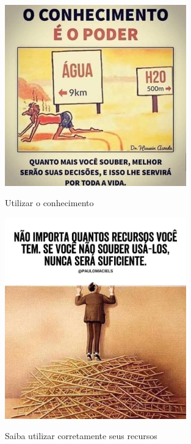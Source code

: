 \begin{figure}
    \centering
    \caption{Utilizar o conhecimento}
	\includegraphics[width=0.7\textwidth]{erros/conhecimento_h2o.jpg}
    \label{fig:conhecimento_h2o}
\end{figure}

\begin{figure}
    \centering
    \caption{Saiba utilizar corretamente seus recursos}
	\includegraphics[width=0.7\textwidth]{erros/uso_de_recursos_escada_1.jpg}
    \label{fig:uso_recursos_escada_1}
\end{figure}

